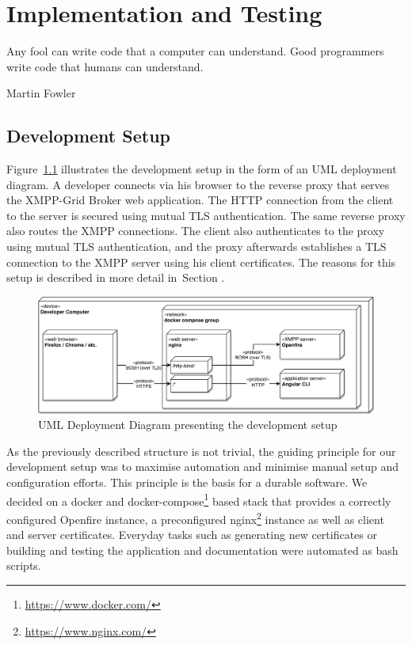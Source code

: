 \chapter{Implementation and Testing} %
\epigraph{Any fool can write code that a computer can understand. Good programmers write code that humans can understand.}{Martin Fowler}


\section{Development Setup}\label{sec:development-setup}

Figure~\ref{fig:development-setup} illustrates the development setup in the form of an UML deployment diagram.
A developer connects via his browser to the reverse proxy that serves the XMPP-Grid Broker web application.
The HTTP connection from the client to the server is secured using mutual TLS authentication.
The same reverse proxy also routes the XMPP connections.
The client also authenticates to the proxy using mutual TLS authentication, and the proxy afterwards establishes a TLS connection to the XMPP server using his client certificates.
The reasons for this setup is described in more detail in~Section .

\begin{figure}[h]
    \centering
    \includegraphics[width=1\linewidth]{resources/development-setup-uml}
    \caption{UML Deployment Diagram presenting the development setup}
    \label{fig:development-setup}
\end{figure}

As the previously described structure is not trivial, the guiding principle for our development setup was to maximise automation and minimise manual setup and configuration efforts. This principle is the basis for a durable software.
We decided on a docker and docker-compose\footnote{\url{https://www.docker.com/}} based stack that provides a correctly configured Openfire instance, a preconfigured nginx\footnote{\url{https://www.nginx.com/}} instance as well as client and server certificates.
Everyday tasks such as generating new certificates or building and testing the application and documentation were automated as bash scripts.

